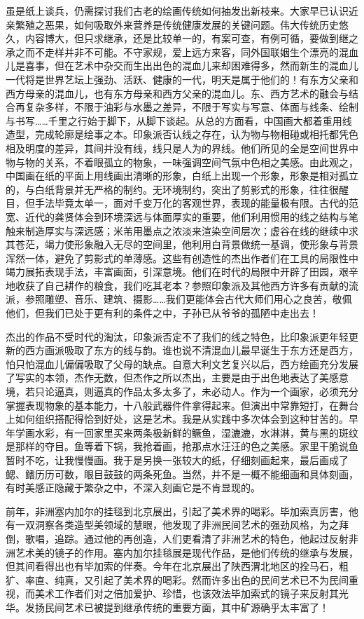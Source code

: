 \documentclass{article}
\begin{document}
虽是纸上谈兵，仍需探讨我们古老的绘画传统如何抽发出新枝来。大家早已认识近亲繁殖之恶果，如何吸取外来营养是传统健康发展的关键问题。伟大传统历史悠久，内容博大，但只求继承，还是比较单一的，有案可查，有例可循，要做到继之承之而不走样并非不可能。不守家规，爱上远方来客，同外国联姻生个漂亮的混血儿是喜事，但在艺术中杂交而生出出色的混血儿来却困难得多，然而新生的混血儿一代将是世界艺坛上强劲、活跃、健康的一代，明天是属于他们的！有东方父亲和西方母亲的混血儿，也有东方母亲和西方父亲的混血儿。东、西方艺术的融会与结合再复杂多样，不限于油彩与水墨之差异，不限于写实与写意、体面与线条、绘制与书写……千里之行始于脚下，从脚下谈起。从总的方面看，中国画大都着重用线造型，完成轮廓是绘事之本。印象派否认线之存在，认为物与物相碰或相托都凭色相及明度的差异，其间并没有线，线只是人为的界线。他们所见的全是空间世界中物与物的关系，不着眼孤立的物象，一味强调空间气氛中色相之美感。由此观之，中国画在纸的平面上用线画出清晰的形象，白纸上出现一个形象，形象是相对孤立的，与白纸背景并无严格的制约。无环境制约，突出了剪影式的形象，往往很醒目，但手法毕竟太单一，面对千变万化的客观世界，表现的能量极有限。古代的范宽、近代的龚贤体会到环境深远与体面厚实的重要，他们利用惯用的线之结构与笔触来制造厚实与深远感；米芾用墨点之浓淡来渲染空间层次；虚谷在线的继续中求其苍茫，竭力使形象融入无尽的空间里，他利用白背景做统一基调，使形象与背景浑然一体，避免了剪影式的单薄感。这些有创造性的杰出作者们在工具的局限性中竭力展拓表现手法，丰富画面，引深意境。他们在时代的局限中开辟了田园，艰辛地收获了自己耕作的粮食，我们吃其老本？参照印象派及其他西方许多有贡献的流派，参照雕塑、音乐、建筑、摄影……我们更能体会古代大师们用心之良苦，敬佩他们，但我们已处于更有利的条件之中，子孙已从爷爷的孤陋中走出去！

杰出的作品不受时代的淘汰，印象派否定不了我们的线之特色，比印象派更年轻更新的西方画派吸取了东方的线与韵。谁也说不清混血儿最早诞生于东方还是西方，怕只怕混血儿偏偏吸取了父母的缺点。自意大利文艺复兴以后，西方绘画充分发展了写实的本领，杰作无数，但杰作之所以杰出，主要是由于出色地表达了美感意境，若只论逼真，则逼真的作品太多太多了，未必动人。作为一个画家，必须充分掌握表现物象的基本能力，十八般武器件件拿得起来。但演出中常靠短打，在舞台上如何组织搭配得恰到好处，这是艺术。我是从实践中多次体会到这种甘苦的。早年学画水彩，有一回家里买来两条极新鲜的鳜鱼，湿漉漉，水淋淋，黄与黑的斑纹是那样的夺目。鱼等着下锅，我抢着画，抢那点水汪汪的色之美感。家里干脆说鱼暂时不吃，让我慢慢画。我于是另换一张较大的纸，仔细刻画起来，最后画成了鳃、鳍历历可数，眼目鼓鼓的两条死鱼。当然，并不是一概不能细画和具体刻画，有时美感正隐藏于繁杂之中，不深入刻画它是不肯显现的。

前年，非洲塞内加尔的挂毯到北京展出，引起了美术界的喝彩。毕加索真厉害，他有一双洞察各类造型美领域的慧眼，他发现了非洲民间艺术的强劲风格，为之拜倒，歌唱，追踪。通过他的再创造，人们更看清了非洲艺术的特色，他起过反射非洲艺术美的镜子的作用。塞内加尔挂毯展是现代作品，是他们传统的继承与发展，但其间看得出也有毕加索的伴奏。今年在北京展出了陕西渭北地区的拴马石，粗犷、率直、纯真，又引起了美术界的喝彩。然而许多出色的民间艺术已不为民间重视，而美术工作者们对之倍加爱护、珍惜，也该效法毕加索式的镜子来反射其光华。发扬民间艺术已被提到继承传统的重要方面，其中矿源确乎太丰富了！
\end{document}
